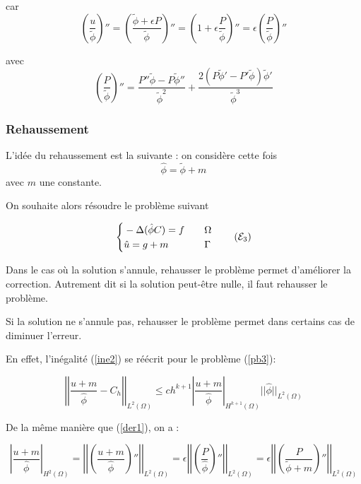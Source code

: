 car
$$\left(\frac{u}{\tilde{\phi}}\right)''=\left(\frac{\tilde{\phi}+\epsilon P}{\tilde{\phi}}\right)''=\left(1+\epsilon\frac{P}{\tilde{\phi}}\right)''=\epsilon\left(\frac{P}{\tilde{\phi}}\right)''$$

avec
$$\left(\frac{P}{\tilde{\phi}}\right)''=\frac{P''\tilde{\phi}-P\tilde{\phi}''}{\tilde{\phi}^2}+\frac{2(P\tilde{\phi}'-P'\tilde{\phi})\tilde{\phi}'}{\tilde{\phi}^3}$$

\subsubsection*{Rehaussement}

L'idée du rehaussement est la suivante : on considère cette fois
$$\hat{\phi}=\tilde{\phi}+m$$
avec $m$ une constante.

On souhaite alors résoudre le problème suivant

\begin{equation}
	\left\{\begin{aligned}
		&-\Delta (\hat{\phi}C)=f \quad &&\Omega \\
		&\hat{u}=g+m \quad &&\Gamma
	\end{aligned}\right. \label{pb3} \tag{$\mathcal{E}_3$}
\end{equation}

Dans le cas où la solution s'annule, rehausser le problème permet d'améliorer la correction. Autrement dit si la solution peut-être nulle, il faut rehausser le problème.

Si la solution ne s'annule pas, rehausser le problème permet dans certains cas de diminuer l'erreur.

En effet, l'inégalité (\ref{ine2}) se réécrit pour le problème (\ref{pb3}):

\begin{equation}
	\left|\left|\frac{u+m}{\hat{\phi}}-C_h\right|\right|_{L^2(\Omega)}\le ch^{k+1}\left|\frac{u+m}{\hat{\phi}}\right|_{H^{k+1}(\Omega)}||\hat{\phi}||_{L^2(\Omega)} \label{ine3}
\end{equation}

De la même manière que (\ref{der1}), on a :

\begin{equation}
	\left|\frac{u+m}{\hat{\phi}}\right|_{H^2(\Omega)}=\left|\left|\left(\frac{u+m}{\hat{\phi}}\right)''\right|\right|_{L^2(\Omega)}=\epsilon\left|\left|\left(\frac{P}{\hat{\phi}}\right)''\right|\right|_{L^2(\Omega)}=\epsilon\left|\left|\left(\frac{P}{\tilde{\phi}+m}\right)''\right|\right|_{L^2(\Omega)} \label{der2}
\end{equation}

